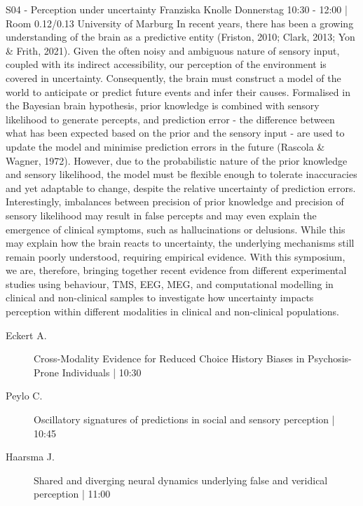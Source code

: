 
            \begin{symposium}
            {S04 - Perception under uncertainty}
            { Franziska Knolle}
            {Donnerstag 10:30 - 12:00 | Room 0.12/0.13}
            {University of Marburg }
            In recent years, there has been a growing understanding of the brain as a predictive entity (Friston, 2010; Clark, 2013; Yon \& Frith, 2021). Given the often noisy and ambiguous nature of sensory input, coupled with its indirect accessibility, our perception of the environment is covered in uncertainty. Consequently, the brain must construct a model of the world to anticipate or predict future events and infer their causes. Formalised in the Bayesian brain hypothesis, prior knowledge is combined with sensory likelihood to generate percepts, and prediction error - the difference between what has been expected based on the prior and the sensory input - are used to update the model and minimise prediction errors in the future (Rascola \& Wagner, 1972). However, due to the probabilistic nature of the prior knowledge and sensory likelihood, the model must be flexible enough to tolerate inaccuracies and yet adaptable to change, despite the relative uncertainty of prediction errors. Interestingly, imbalances between precision of prior knowledge and precision of sensory likelihood may result in false percepts and may even explain the emergence of clinical symptoms, such as hallucinations or delusions. While this may explain how the brain reacts to uncertainty, the underlying mechanisms still remain poorly understood, requiring empirical evidence.
With this symposium, we are, therefore, bringing together recent evidence from different experimental studies using behaviour, TMS, EEG, MEG, and computational modelling in clinical and non-clinical samples to investigate how uncertainty impacts perception within different modalities in clinical and non-clinical populations.
            \begin{description}    
            
                \item [ Eckert A.] Cross-Modality Evidence for Reduced Choice History Biases in Psychosis-Prone Individuals  \textcolor{mygray}{ | 10:30}    
                
                \item [ Peylo C.] Oscillatory signatures of predictions in social and sensory perception  \textcolor{mygray}{ | 10:45}    
                
                \item [ Haarsma J.] Shared and diverging neural dynamics underlying false and veridical perception  \textcolor{mygray}{ | 11:00}    
                

\end{description}
\end{symposium}
